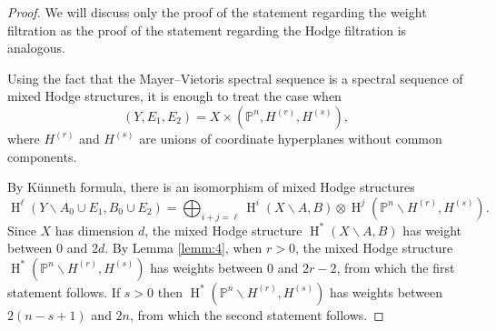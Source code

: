 \documentclass[11pt,a4paper]{amsart}
\renewcommand{\P}{\mathds{P}}
\DeclareMathOperator{\rH}{H}
\numberwithin{equation}{section}
\theoremstyle{plain}
\theoremstyle{definition}
\begin{document}
\begin{proof}
  We will discuss only the proof of the statement regarding the weight
  filtration as the proof of the statement regarding the Hodge
  filtration is analogous.
  
  Using the fact that the Mayer--Vietoris spectral sequence is a spectral
  sequence of mixed Hodge structures, it is enough to treat the case when
  \begin{displaymath}
    (Y,E_{1},E_{2})=X\times (\P^{n},H^{(r)},H^{(s)}),
  \end{displaymath}
  where $H^{(r)}$ and $H^{(s)}$ are unions of coordinate
  hyperplanes without common components.

  By K\"unneth formula, there is an isomorphism of mixed Hodge
  structures  
  \begin{displaymath}
    \rH^{\ell}(Y\smallsetminus A_{0}\cup E_{1},B_{0}\cup E_{2})=
    \bigoplus _{i+j=\ell} \rH^{i}(X\smallsetminus A,B)\otimes
    \rH^{j}(\P^{n}\smallsetminus H^{(r)},H^{(s)}).
  \end{displaymath}
  Since $X$ has dimension $d$, the mixed Hodge structure
  $\rH^{\ast}(X\smallsetminus A,B)$ has weight between $0$ and
  $2d$. By Lemma \ref{lemm:4}, when $r>0$, the mixed Hodge structure
  $\rH^{\ast}(\P^{n}\smallsetminus H^{(r)}, H^{(s)})$ has weights
  between $0$ and $2r-2$, from which the first statement follows. If
  $s>0$ then $\rH^{\ast}(\P^{n}\smallsetminus H^{(r)}, H^{(s)})$ has
  weights between $2(n-s+1)$ and $2n$, from which the second statement
  follows. 
\end{proof}
\end{document}
